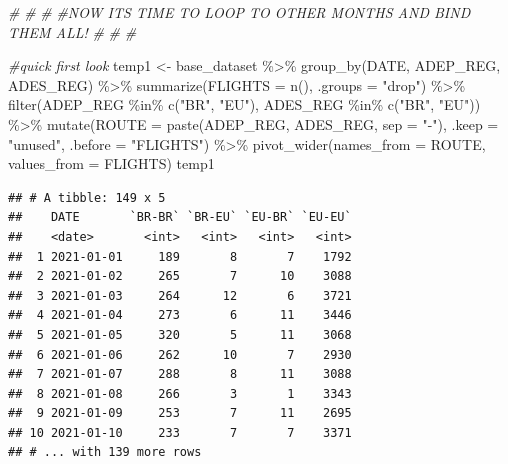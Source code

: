 \documentclass[conference,final,]{IEEEtran}
\newenvironment{Shaded}{\begin{snugshade}}{\end{snugshade}}
\newcommand{\AttributeTok}[1]{\textcolor[rgb]{0.77,0.63,0.00}{#1}}
\newcommand{\CommentTok}[1]{\textcolor[rgb]{0.56,0.35,0.01}{\textit{#1}}}
\newcommand{\FunctionTok}[1]{\textcolor[rgb]{0.00,0.00,0.00}{#1}}
\newcommand{\NormalTok}[1]{#1}
\newcommand{\OtherTok}[1]{\textcolor[rgb]{0.56,0.35,0.01}{#1}}
\newcommand{\SpecialCharTok}[1]{\textcolor[rgb]{0.00,0.00,0.00}{#1}}
\newcommand{\StringTok}[1]{\textcolor[rgb]{0.31,0.60,0.02}{#1}}
\begin{document}
\begin{Shaded}
\begin{Highlighting}[]
\CommentTok{\#}
\CommentTok{\#}
\CommentTok{\#}
\CommentTok{\#NOW IT\textquotesingle{}S TIME TO LOOP TO OTHER MONTHS AND BIND THEM ALL!}
\CommentTok{\#}
\CommentTok{\#}
\CommentTok{\#}
\end{Highlighting}
\end{Shaded}

\begin{Shaded}
\begin{Highlighting}[]
\CommentTok{\#quick first look}
\NormalTok{temp1 }\OtherTok{\textless{}{-}}\NormalTok{ base\_dataset }\SpecialCharTok{\%\textgreater{}\%} \FunctionTok{group\_by}\NormalTok{(DATE, ADEP\_REG, ADES\_REG) }\SpecialCharTok{\%\textgreater{}\%} \FunctionTok{summarize}\NormalTok{(}\AttributeTok{FLIGHTS =} \FunctionTok{n}\NormalTok{(), }\AttributeTok{.groups =} \StringTok{"drop"}\NormalTok{) }\SpecialCharTok{\%\textgreater{}\%}
  \FunctionTok{filter}\NormalTok{(ADEP\_REG }\SpecialCharTok{\%in\%} \FunctionTok{c}\NormalTok{(}\StringTok{"BR"}\NormalTok{, }\StringTok{"EU"}\NormalTok{), ADES\_REG  }\SpecialCharTok{\%in\%} \FunctionTok{c}\NormalTok{(}\StringTok{"BR"}\NormalTok{, }\StringTok{"EU"}\NormalTok{)) }\SpecialCharTok{\%\textgreater{}\%}
  \FunctionTok{mutate}\NormalTok{(}\AttributeTok{ROUTE =} \FunctionTok{paste}\NormalTok{(ADEP\_REG, ADES\_REG, }\AttributeTok{sep =} \StringTok{"{-}"}\NormalTok{), }\AttributeTok{.keep =} \StringTok{"unused"}\NormalTok{, }\AttributeTok{.before =} \StringTok{"FLIGHTS"}\NormalTok{) }\SpecialCharTok{\%\textgreater{}\%}
  \FunctionTok{pivot\_wider}\NormalTok{(}\AttributeTok{names\_from =}\NormalTok{ ROUTE, }\AttributeTok{values\_from =}\NormalTok{ FLIGHTS) }
\NormalTok{temp1}
\end{Highlighting}
\end{Shaded}

\begin{verbatim}
## # A tibble: 149 x 5
##    DATE       `BR-BR` `BR-EU` `EU-BR` `EU-EU`
##    <date>       <int>   <int>   <int>   <int>
##  1 2021-01-01     189       8       7    1792
##  2 2021-01-02     265       7      10    3088
##  3 2021-01-03     264      12       6    3721
##  4 2021-01-04     273       6      11    3446
##  5 2021-01-05     320       5      11    3068
##  6 2021-01-06     262      10       7    2930
##  7 2021-01-07     288       8      11    3088
##  8 2021-01-08     266       3       1    3343
##  9 2021-01-09     253       7      11    2695
## 10 2021-01-10     233       7       7    3371
## # ... with 139 more rows
\end{verbatim}
\end{document}
